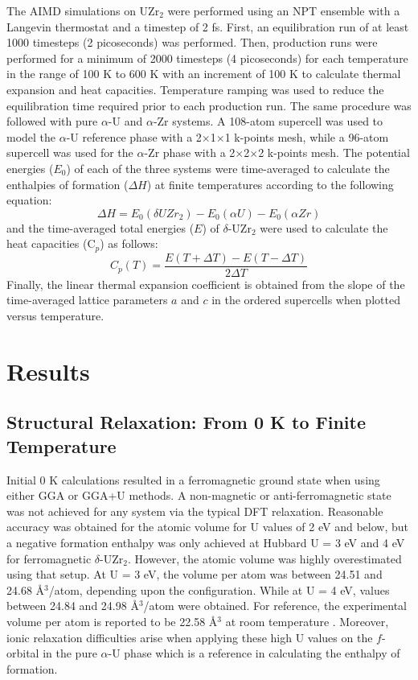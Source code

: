 \documentclass[preprint,12pt]{elsarticle}
\begin{document}
The AIMD simulations on UZr$_2$ were performed using an NPT ensemble with a Langevin thermostat and a timestep of 2 fs. First, an equilibration run of at least 1000 timesteps (2 picoseconds) was performed.   Then, production runs were performed for a minimum of 2000 timesteps (4 picoseconds) for each temperature in the range of 100 K to 600 K with an increment of 100 K to calculate thermal expansion and heat capacities. Temperature ramping was used to reduce the equilibration time required prior to each production run. The same procedure was followed with pure $\alpha$-U and $\alpha$-Zr systems. A 108-atom supercell was used to model the $\alpha$-U reference phase with a 2$\times$1$\times$1 k-points mesh, while a 96-atom supercell was used for the $\alpha$-Zr phase with a 2$\times$2$\times$2 k-points mesh. The potential energies ($E_0$) of each of the three systems were time-averaged to calculate the enthalpies of formation ($\Delta H$) at finite temperatures according to the following equation:
\[\Delta H = E_0(\delta UZr_2) - E_0(\alpha U) - E_0(\alpha Zr) \]
and the time-averaged total energies ($E$) of $\delta$-UZr$_2$ were used to calculate the heat capacities (C$_p$) as follows:
\[C_p(T) = \frac{E(T+\Delta T) - E(T-\Delta T)}{2 \Delta T} \]
Finally, the linear thermal expansion coefficient is obtained from the slope of the time-averaged lattice parameters $a$ and $c$ in the ordered supercells when plotted versus temperature.

\section{Results}

\subsection{Structural Relaxation: From 0 K to Finite Temperature}

Initial 0 K calculations resulted in a ferromagnetic ground state when using either GGA or GGA+U methods. A non-magnetic or anti-ferromagnetic state was not achieved for any system via the typical DFT relaxation. Reasonable accuracy was obtained for the atomic volume for U values of 2 eV and below, but a negative formation enthalpy was only achieved at Hubbard U = 3 eV and 4 eV for ferromagnetic $\delta$-UZr$_2$. However, the atomic volume was highly overestimated using that setup. At U = 3 eV, the volume per atom was between 24.51 and 24.68 {\AA}$^3$/atom, depending upon the configuration. While at U = 4 eV, values between 24.84 and 24.98 {\AA}$^3$/atom were obtained. For reference, the experimental volume per atom is reported to be 22.58 {\AA}$^3$ at room temperature \cite{akabori_lattice_1995}. Moreover, ionic relaxation difficulties arise when applying these high U values on the $f$-orbital in the pure $\alpha$-U phase which is a reference in calculating the enthalpy of formation.
\end{document}

